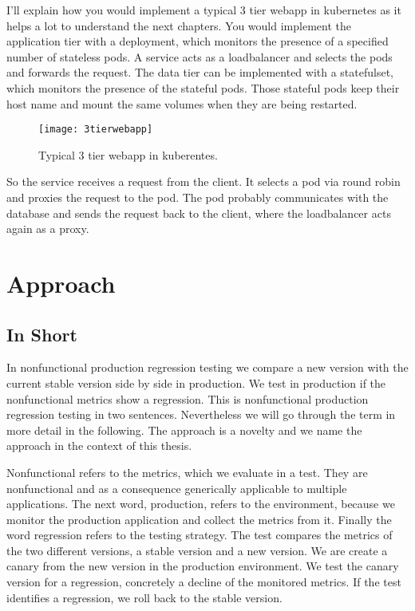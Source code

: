 I'll explain how you would implement a typical 3 tier webapp in kubernetes as it helps a
lot to understand the next chapters. You would implement the application tier with a
deployment, which monitors the presence of a specified number of stateless pods. A service
acts as a loadbalancer and selects the pods and forwards the request. The data tier can be
implemented with a statefulset, which monitors the presence of the stateful pods. Those
stateful pods keep their host name and mount the same volumes when they are being
restarted.

\begin{figure}[htbp]
  \centering
  \texttt{[image: 3tierwebapp]}
  \caption[3tierwebapp]{Typical 3 tier webapp in kuberentes.}
  \label{fig:3tierwebapp}
\end{figure}

So the service receives a request from the client. It selects a pod via round robin and
proxies the request to the pod. The pod probably communicates with the database and sends
the request back to the client, where the loadbalancer acts again as a proxy.

\chapter{Approach}

\section{In Short}

In nonfunctional production regression testing we compare a new version with the current
stable version side by side in production. We test in production if the nonfunctional
metrics show a regression. This is nonfunctional production regression testing in two
sentences.  Nevertheless we will go through the term in more detail in the following. The
approach is a novelty and we name the approach in the context of this thesis.

Nonfunctional refers to the metrics, which we evaluate in a test. They are nonfunctional
and as a consequence generically applicable to multiple applications. The next word,
production, refers to the environment, because we monitor the production application and
collect the metrics from it. Finally the word regression refers to the testing
strategy. The test compares the metrics of the two different versions, a stable version
and a new version. We are create a canary from the new version in the production
environment. We test the canary version for a regression, concretely a decline of the
monitored metrics. If the test identifies a regression, we roll back to the stable
version.

